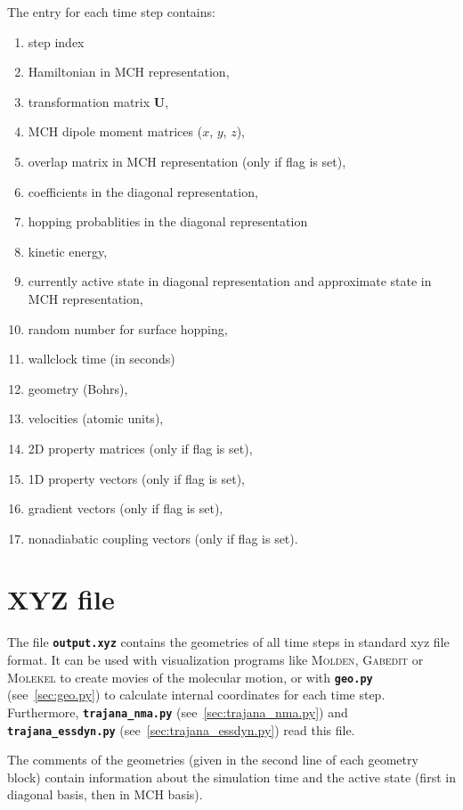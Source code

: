 \documentclass[a4paper,10pt,DIV=15,openany,twoside=false]{scrbook}
\newcommand{\ttt}[1]{\textbf{\texttt{#1}}}
\newcommand{\VEC}[1]{\ensuremath{\mathbf{#1}}}
\begin{document}
The entry for each time step contains:
\begin{enumerate}
  \item step index
  \item Hamiltonian in MCH representation,
  \item transformation matrix $\VEC{U}$,
  \item MCH dipole moment matrices ($x$, $y$, $z$),
  \item overlap matrix in MCH representation (only if flag is set),
  \item coefficients in the diagonal representation,
  \item hopping probablities in the diagonal representation
  \item kinetic energy,
  \item currently active state in diagonal representation and approximate state in MCH representation,
  \item random number for surface hopping,
  \item wallclock time (in seconds)
  \item geometry (Bohrs),
  \item velocities (atomic units),
  \item 2D property matrices (only if flag is set),
  \item 1D property vectors (only if flag is set),
  \item gradient vectors (only if flag is set),
  \item nonadiabatic coupling vectors (only if flag is set).
\end{enumerate}

\section{XYZ file}\label{sec:xyzfile}

The file \ttt{output.xyz} contains the geometries of all time steps in standard xyz file format. It can be used with visualization programs like \textsc{Molden}, \textsc{Gabedit} or \textsc{Molekel} to create movies of the molecular motion, or with \ttt{geo.py} (see~\ref{sec:geo.py}) to calculate internal coordinates for each time step. Furthermore, \ttt{trajana\_nma.py} (see~\ref{sec:trajana_nma.py}) and \ttt{trajana\_essdyn.py} (see~\ref{sec:trajana_essdyn.py}) read this file.

The comments of the geometries (given in the second line of each geometry block) contain information about the simulation time and the active state (first in diagonal basis, then in MCH basis).
\end{document}
